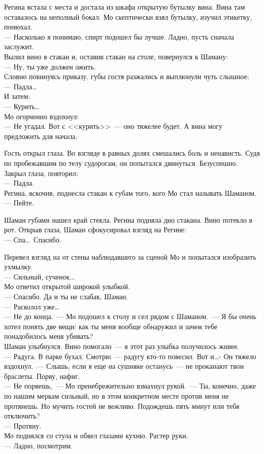 Регина встала с места и достала из шкафа открытую бутылку вина. Вина там 
оставалось на неполный бокал. Мо скептически взял бутылку, изучил этикетку, 
понюхал.\\
--- Насколько я понимаю, спирт подошел бы лучше. Ладно, пусть сначала заслужит.\\
Вылил вино в стакан и, оставив стакан на столе, повернулся к Шаману:\\
--- Ну, ты уже должен ожить.\\
Словно повинуясь приказу, губы гостя разжались и выплюнули чуть слышное:\\
--- Падла\ldots\\
И затем:\\
--- Курить\ldots\\
Мо огорченно вздохнул:\\
--- Не угадал. Вот с <<курить>>~--- оно тяжелее будет. А вина могу предложить для 
начала.

Гость открыл глаза. Во взгляде в равных долях смешались боль и ненависть. Судя 
по пробежавшим по телу судорогам, он попытался двинуться. Безуспешно. Закрыл 
глаза, повторил:\\
--- Падла.\\
Регина, вскочив, поднесла стакан к губам того, кого Мо стал называть Шаманом.\\
--- Пейте.

Шаман губами нашел край стекла. Регина подняла дно стакана. Вино потекло в рот. 
Открыв глаза, Шаман сфокусировал взгляд на Регине:\\
--- Спа\ldots\ Спасибо.


Перевел взгляд на от стены наблюдавшего за сценой Мо и попытался изобразить 
ухмылку.\\
--- Сильный, сученок\ldots\\
Мо ответил открытой широкой улыбкой.\\
--- Спасибо. Да и ты не слабак, Шаман.\\
--- Расколол уже\ldots\\
--- Не до конца.~--- Мо подошел к столу и сел рядом с Шаманом.~--- Я бы очень 
хотел понять две вещи: как ты меня вообще обнаружил и зачем тебе понадобилось меня 
убивать?\\
Шаман улыбнулся. Вино помогало~--- в этот раз улыбка получилось живее.\\
--- Радуга. В парке бухал. Смотрю~--- радугу кто-то повесил. Вот и\ldots- Он 
тяжело вздохнул.~--- Слышь, если я еще на сушняке останусь~--- не проканают твои 
браслеты. Порву, нафиг.\\
--- Не порвешь,~--- Мо пренебрежительно взмахнул рукой.~--- Ты, конечно, даже по 
нашим меркам сильный, но в этом конкретном месте против меня не протянешь. Но мучить 
гостей не вежливо. Подождешь пять минут или тебя отключить?\\
--- Протяну.\\
Мо поднялся со стула и обвел глазами кухню. Растер руки.\\
--- Ладно, посмотрим.

